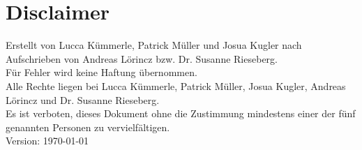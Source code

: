 \section*{Disclaimer}
	Erstellt von Lucca Kümmerle, Patrick Müller und Josua Kugler nach Aufschrieben von Andreas Lörincz bzw. Dr. Susanne Rieseberg. \\ Für Fehler wird keine Haftung übernommen. \\ Alle Rechte liegen bei Lucca Kümmerle, Patrick Müller, Josua Kugler, Andreas Lörincz und Dr. Susanne Rieseberg. \\ Es ist verboten, dieses Dokument ohne die Zustimmung mindestens einer der fünf genannten Personen zu vervielfältigen. \\
	Version: \today